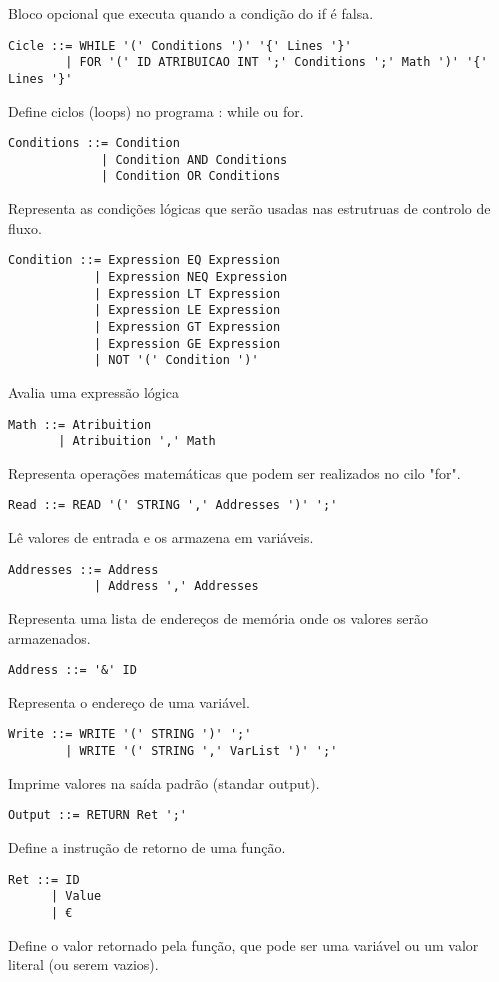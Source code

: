 \documentclass[12pt,a4paper]{report}
\begin{document}
Bloco opcional que executa quando a condição do if é falsa.
\begin{lstlisting}
Cicle ::= WHILE '(' Conditions ')' '{' Lines '}'
        | FOR '(' ID ATRIBUICAO INT ';' Conditions ';' Math ')' '{' Lines '}'
\end{lstlisting}
Define ciclos (loops) no programa : while ou for.
\begin{lstlisting}
Conditions ::= Condition
             | Condition AND Conditions
             | Condition OR Conditions
\end{lstlisting}
Representa as condições lógicas que serão usadas nas estrutruas de controlo de fluxo.
\begin{lstlisting}
Condition ::= Expression EQ Expression
            | Expression NEQ Expression
            | Expression LT Expression
            | Expression LE Expression
            | Expression GT Expression
            | Expression GE Expression
            | NOT '(' Condition ')'
\end{lstlisting}
Avalia uma expressão lógica
\begin{lstlisting}
Math ::= Atribuition
       | Atribuition ',' Math
\end{lstlisting}
Representa operações matemáticas que podem ser realizados no cilo "for".
\begin{lstlisting}
Read ::= READ '(' STRING ',' Addresses ')' ';'
\end{lstlisting}
Lê valores de entrada e os armazena em variáveis.
\begin{lstlisting}
Addresses ::= Address
            | Address ',' Addresses
\end{lstlisting}
Representa uma lista de endereços de memória onde os valores serão armazenados.
\begin{lstlisting}
Address ::= '&' ID
\end{lstlisting}
Representa o endereço de uma variável.
\begin{lstlisting}
Write ::= WRITE '(' STRING ')' ';'
        | WRITE '(' STRING ',' VarList ')' ';'
\end{lstlisting}
Imprime valores na saída padrão (standar output).
\begin{lstlisting}
Output ::= RETURN Ret ';'
\end{lstlisting}
Define a instrução de retorno de uma função.
\begin{lstlisting}
Ret ::= ID
      | Value
      | €
\end{lstlisting}
Define o valor retornado pela função, que pode ser uma variável ou um valor literal (ou serem vazios).
\end{document}
